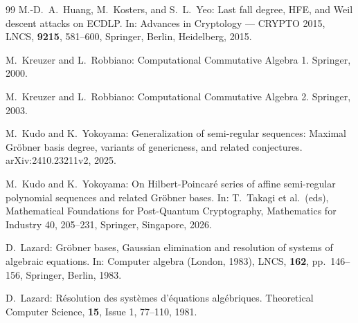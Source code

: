 \documentclass{article}
\theoremstyle{definition}
\theoremstyle{plain}
\theoremstyle{plain}
\theoremstyle{plain}
\theoremstyle{plain}
\numberwithin{equation}{subsection}
\begin{document}
\begin{thebibliography}{99}
M.-D.\ A.\ Huang, M.\ Kosters, and S.\ L.\ Yeo:
Last fall degree, HFE, and Weil descent attacks on ECDLP.
In: Advances in Cryptology --- CRYPTO 2015, LNCS, {\bf 9215}, 581--600, Springer, Berlin, Heidelberg, 2015.




M.\ Kreuzer and L.\ Robbiano:
Computational Commutative Algebra 1. 
Springer, 2000.

M.\ Kreuzer and L.\ Robbiano:
Computational Commutative Algebra 2. 
Springer, 2003.

M.\ Kudo and K.\ Yokoyama:
Generalization of semi-regular sequences:
Maximal Gr\"obner basis degree, variants of genericness, and related conjectures.
arXiv:2410.23211v2, 2025.

M.\ Kudo and K.\ Yokoyama:
On Hilbert-Poincar\'e series of affine semi-regular polynomial sequences and related 
Gr\"obner bases.
In:  T.\ Takagi et al.\ (eds), Mathematical Foundations for Post-Quantum Cryptography, 
Mathematics for Industry 40, 205--231, Springer, Singapore, 2026. 


D.\ Lazard:
Gr\"{o}bner bases, Gaussian elimination and resolution of systems of algebraic equations.
In: Computer algebra (London, 1983), LNCS, {\bf 162}, pp.\ 146--156, Springer, Berlin, 1983.

D.\ Lazard:
R\'{e}solution des syst\`{e}mes d'\'{e}quations alg\'{e}briques.
Theoretical Computer Science, {\bf 15}, Issue 1, 77--110, 1981.



\end{thebibliography}
\end{document}
